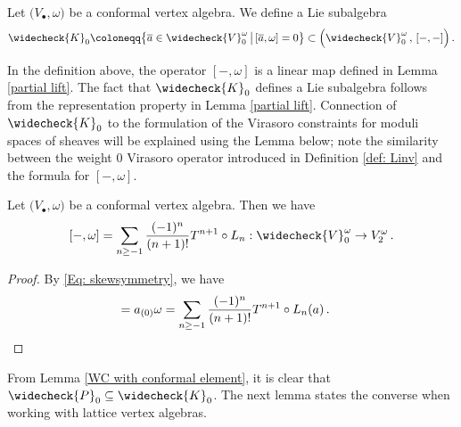 \begin{definition}
\notready
Let $\big(V_\bullet,\omega\big)$ be a conformal vertex algebra. We define a Lie subalgebra
$$\widecheck{K}_0\coloneqq \big\{\overline{a}\in \widecheck{V}^\omega_0\,\big|\,[\overline{a},\omega]=0
\big\}\subset\Big(\widecheck{V}^\omega_{0}\,,\, [-,-]\Big)\,.
$$
\end{definition}
In the definition above, the operator $[-,\omega]$ is a linear map defined in Lemma \ref{partial lift}. The fact that $\widecheck{K}_0$ defines a Lie subalgebra follows from the representation property in Lemma \ref{partial lift}. Connection of $\widecheck{K}_0$ to the formulation of the Virasoro constraints for moduli spaces of sheaves will be explained using the Lemma below; note the similarity between the weight 0 Virasoro operator introduced in Definition \ref{def: Linv} and the formula for $[-, \omega]$.
\begin{lemma}
\notready\label{WC with conformal element}
Let $\big(V_\bullet,\omega\big)$ be a conformal vertex algebra. Then we have
$$[-,\omega]=\sum_{n\geq -1}\frac{(-1)^n}{(n+1)!}T^{n+1}\circ L_n:\widecheck{V}_0^\omega\rightarrow V_{2}^\omega\,.
$$
\end{lemma}
\begin{proof}
By  \eqref{Eq: skewsymmetry}, we have
\begin{align*}
    [\overline{a},\omega] = a_{(0)}\omega
   =\sum_{n\geq -1}\frac{(-1)^{n}}{(n+1)!}T^{n+1}\circ L_n(a)\,.\quad\qedhere
\end{align*}
\end{proof}

From Lemma \ref{WC with conformal element}, it is clear that $\widecheck{P}_0\subseteq \widecheck{K}_0$. The next lemma states the converse when working with lattice vertex algebras.

